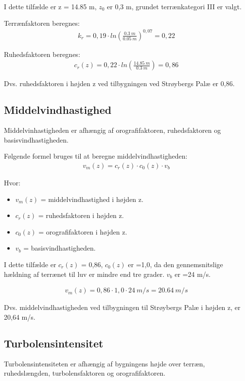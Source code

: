 I dette tilfælde er z = 14.85 m, $ z_{0} $ er 0,3 m, grundet terrænkategori III er valgt.


Terrænfaktoren beregnes:
\begin{align*}
k_{r} = 0,19 \cdot ln\left(\frac{\SI{0,3}{m}}{\SI{0,05}{m}}\right)^{0,07} = 0,22
\end{align*}

Ruhedsfaktoren beregnes:
\begin{align*}
c_{r}(z) = 0,22 \cdot ln\left(\frac{\SI{14.85}{m}}{\SI{0,3}{m}}\right) = 0,86
\end{align*}

Dvs. ruhedsfaktoren i højden z ved tilbygningen ved Strøybergs Palæ er 0,86.


\subsection{Middelvindhastighed}
Middelvinhastigheden er afhængig af orografifaktoren, ruhedsfaktoren og basisvindhastigheden.

Følgende formel bruges til at beregne middelvindhastigheden:
\begin{align*}
v_{m}(z) =c_{r}(z) \cdot c_{0}(z) \cdot v_{b}
\end{align*}

Hvor:
\begin{itemize}
\item $ v_{m}(z) $ = middelvindhastighed i højden z.
\item $ c_{r}(z) $ = ruhedsfaktoren i højden z.
\item $ c_{0}(z) $ = orografifaktoren i højden z.
\item $ v_{b} $ = basisvindhastigheden.
\end{itemize}

I dette tilfælde er $ c_{r}(z) $ = 0,86, $ c_{0}(z) $ er =1,0, da den gennemsnitslige hældning af terrænet til luv er mindre end tre grader. $ v_{b} $ er =24 m/s.

\begin{align*}
v_{m}(z) = 0,86 \cdot 1,0 \cdot \SI{24}{m/s} = \SI{20.64}{m/s}
\end{align*}

Dvs. middelvindhastigheden ved tilbygningen til Strøybergs Palæ i højden z, er 20,64 m/s.



\subsection{Turbolensintensitet}
Turbolensintensiteten er afhængig af bygningens højde over terræn, ruhedslængden, turbolensfaktoren og orografifaktoren.

